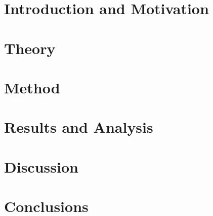 \mainmatter

\chapter{Introduction and Motivation}
\label{cha:introduction_and_motivation}


\vspace{\fill}

\newpage

\chapter{Theory}
\label{cha:theory}


\vspace{\fill}

\newpage

\chapter{Method}
\label{cha:method}


\vspace{\fill}

\newpage

\chapter{Results and Analysis}
\label{cha:results_and_analysis}


\vspace{\fill}

\newpage

\chapter{Discussion}
\label{cha:discussion}


\vspace{\fill}

\newpage

\chapter{Conclusions}
\label{cha:conclusions}


